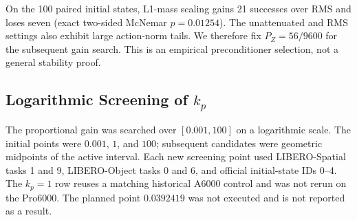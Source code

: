 \begin{table}[H]
    \centering
    \small
    \caption{DreamZero state-preconditioner screening on LIBERO-Spatial and
    LIBERO-Object.}
    \label{tab:dreamzero-preconditioner-screen}
\end{table}

On the 100 paired initial states, L1-mass scaling gains 21 successes over RMS
and loses seven (exact two-sided McNemar $p=0.01254$). The unattenuated and RMS
settings also exhibit large action-norm tails. We therefore fix
$P_Z=56/9600$ for the subsequent gain search. This is an empirical
preconditioner selection, not a general stability proof.

\subsection{Logarithmic Screening of $k_p$}

The proportional gain was searched over $[0.001,100]$ on a logarithmic scale.
The initial points were $0.001$, $1$, and $100$; subsequent candidates were
geometric midpoints of the active interval. Each new screening point used
LIBERO-Spatial tasks 1 and 9, LIBERO-Object tasks 0 and 6, and official
initial-state IDs 0--4. The $k_p=1$ row reuses a matching historical A6000
control and was not rerun on the Pro6000. The planned point $0.0392419$ was not
executed and is not reported as a result.

